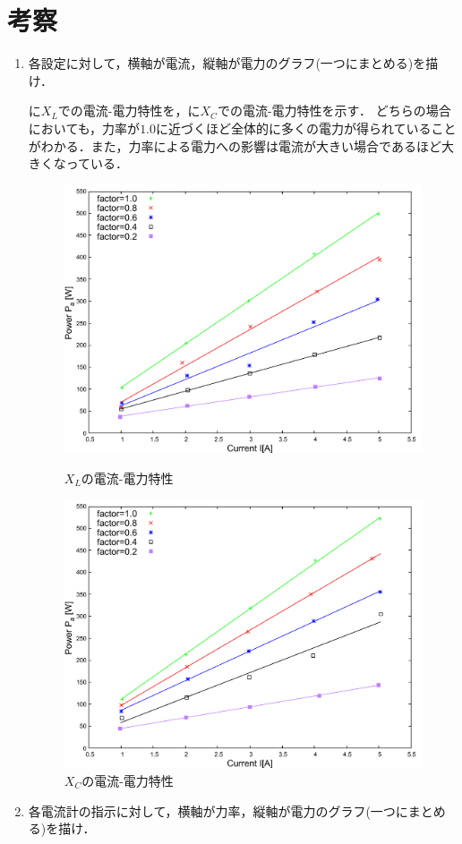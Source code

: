 \clearpage
\section{考察}
\begin{enumerate}[1.)]
	\item 各設定に対して，横軸が電流，縦軸が電力のグラフ(一つにまとめる)を描け．
	
	に$X_{L}$での電流-電力特性を，に$X_{C}$での電流-電力特性を示す．
	どちらの場合においても，力率が$1.0$に近づくほど全体的に多くの電力が得られていることがわかる．また，力率による電力への影響は電流が大きい場合であるほど大きくなっている．
	\begin{figure}[h]
	\centering
	\includegraphics[scale=0.51]{./data/L/L.pdf}
	\caption{$X_L$の電流-電力特性}
	\label{fig:L}
	\includegraphics[scale=0.51]{./data/C/C.pdf}
	\caption{$X_C$の電流-電力特性}
	\label{fig:C}
	\end{figure}
	\newpage
	\item 各電流計の指示に対して，横軸が力率，縦軸が電力のグラフ(一つにまとめる)を描け．
	

\end{enumerate}
